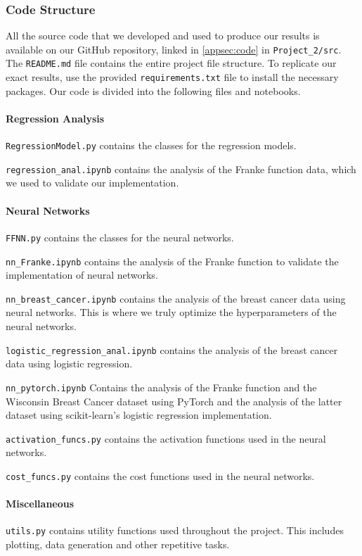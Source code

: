 \subsubsection{Code Structure}\label{subsec:codestructure}
All the source code that we developed and used to produce our results is available on our GitHub repository, linked in \cref{appsec:code} in \verb|Project_2/src|. The \verb|README.md| file contains the entire project file structure. To replicate our exact results, use the provided \verb|requirements.txt| file to install the necessary packages. Our code is divided into the following files and notebooks.

\paragraph*{Regression Analysis}
\verb|RegressionModel.py| contains the classes for the regression models.

\verb|regression_anal.ipynb| contains the analysis of the Franke function data, which we used to validate our implementation.

\paragraph*{Neural Networks}
\verb|FFNN.py| contains the classes for the neural networks.

\verb|nn_Franke.ipynb| contains the analysis of the Franke function to validate the implementation of neural networks.

\verb|nn_breast_cancer.ipynb| contains the analysis of the breast cancer data using neural networks. This is where we truly optimize the hyperparameters of the neural networks.

\verb|logistic_regression_anal.ipynb| contains the analysis of the breast cancer data using logistic regression.

\verb|nn_pytorch.ipynb| Contains the analysis of the Franke function and the Wisconsin Breast Cancer dataset using PyTorch and the analysis of the latter dataset using scikit-learn's logistic regression implementation.

\verb|activation_funcs.py| contains the activation functions used in the neural networks.

\verb|cost_funcs.py| contains the cost functions used in the neural networks.

\paragraph*{Miscellaneous}
\verb|utils.py| contains utility functions used throughout the project. This includes plotting, data generation and other repetitive tasks.

